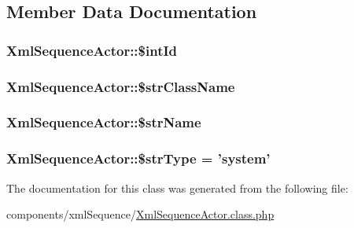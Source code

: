 \subsection{Member Data Documentation}
\hypertarget{class_xml_sequence_actor_dd493b41d7dee80396a221877c3dd03e}{
\subsubsection[{\$intId}]{\setlength{\rightskip}{0pt plus 5cm}XmlSequenceActor::\$intId}}
\label{class_xml_sequence_actor_dd493b41d7dee80396a221877c3dd03e}


\hypertarget{class_xml_sequence_actor_a2d9ac4998253ff27d78df9bae5c0e15}{
\subsubsection[{\$strClassName}]{\setlength{\rightskip}{0pt plus 5cm}XmlSequenceActor::\$strClassName}}
\label{class_xml_sequence_actor_a2d9ac4998253ff27d78df9bae5c0e15}


\hypertarget{class_xml_sequence_actor_d280c64839b80da1e32256f2372b5a52}{
\subsubsection[{\$strName}]{\setlength{\rightskip}{0pt plus 5cm}XmlSequenceActor::\$strName}}
\label{class_xml_sequence_actor_d280c64839b80da1e32256f2372b5a52}


\hypertarget{class_xml_sequence_actor_ebf4a5295ed4ecbbf2a108a8345f1a80}{
\subsubsection[{\$strType}]{\setlength{\rightskip}{0pt plus 5cm}XmlSequenceActor::\$strType = 'system'}}
\label{class_xml_sequence_actor_ebf4a5295ed4ecbbf2a108a8345f1a80}




The documentation for this class was generated from the following file:\begin{CompactItemize}
\item 
components/xmlSequence/\hyperlink{_xml_sequence_actor_8class_8php}{XmlSequenceActor.class.php}\end{CompactItemize}

